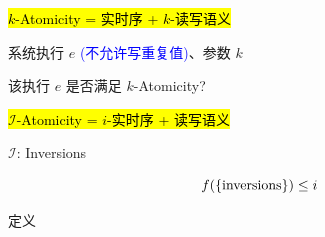 \begin{frame}{}
  \begin{center}
    \hl{\large $k$-Atomicity = 实时序 + $k$-读写语义} \\[5pt]
    
     
  \end{center}

  \vspace{0.20cm}
  \begin{center}
    \resizebox{0.75\textwidth}{!}{}
  \end{center}

\end{frame}

\begin{frame}{}
  \begin{cdef}
    \vspace{8pt}
    \begin{description}
      \setlength{\itemsep}{8pt}
      \item[实例:] 系统执行 $e$ \textcolor{blue}{\small (不允许写重复值)}、参数 $k$
      \item[问题:] 该执行 $e$ 是否满足 $k$-Atomicity?
    \end{description}
  \end{cdef}
\end{frame}

\begin{frame}{}
  \begin{center}
    \hl{\large $\mathcal{I}$-Atomicity = $i$-实时序 + 读写语义}
  \end{center}

  \vspace{0.60cm}
  \centerline{$\mathcal{I}$: Inversions}

  \pause
  \vspace{0.30cm}
  \[
    f(\{\text{inversions}\}) \le i
  \]

  \pause
  \vspace{0.50cm}
  \centerline{\large 定义}
\end{frame}

